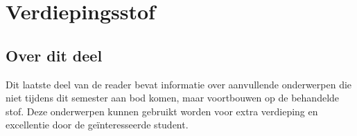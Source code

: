 \documentclass[a4paper,openany]{tufte-book-hu}
\begin{document}
\part{Verdiepingsstof}
\chapter{Over dit deel}

Dit laatste deel van de reader bevat informatie over aanvullende onderwerpen die niet tijdens dit semester aan bod komen, maar voortbouwen op de behandelde stof. Deze onderwerpen kunnen gebruikt worden voor extra verdieping en excellentie door de ge\"interesseerde student.



% 



\end{document}

